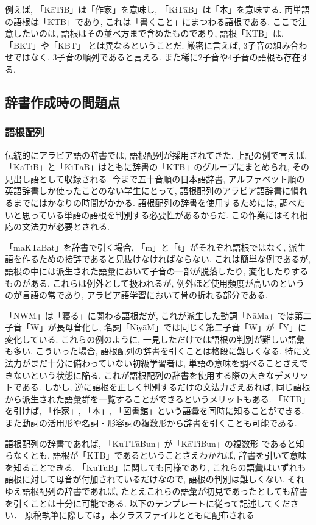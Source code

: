 \documentclass[technicalreport]{ieicej}
\begin{document}
例えば, 「KāTiB」は「作家」を意味し, 「KiTāB」は「本」を意味する. 両単語の語根は「KTB」であり, これは「書くこと」にまつわる語根である. ここで注意したいのは, 語根はその並べ方まで含めたものであり, 語根「KTB」は, 「BKT」や「KBT」 とは異なるということだ. 厳密に言えば, 3子音の組み合わせではなく, 3子音の順列であると言える. また稀に2子音や4子音の語根も存在する. 

\subsection{辞書作成時の問題点}
\subsubsection{語根配列}
伝統的にアラビア語の辞書では, 語根配列が採用されてきた. 上記の例で言えば, 「KāTiB」と「KiTāB」はともに辞書の「KTB」のグループにまとめられ, その見出し語として収録される. 今まで五十音順の日本語辞書, アルファベット順の英語辞書しか使ったことのない学生にとって, 語根配列のアラビア語辞書に慣れるまでにはかなりの時間がかかる. 語根配列の辞書を使用するためには, 調べたいと思っている単語の語根を判別する必要性があるからだ. この作業にはそれ相応の文法力が必要とされる. 

「maKTaBat」を辞書で引く場合, 「m」と「t」がそれぞれ語根ではなく, 派生語を作るための接辞であると見抜けなければならない. これは簡単な例であるが, 語根の中には派生された語彙において子音の一部が脱落したり, 変化したりするものがある. これらは例外として扱われるが, 例外ほど使用頻度が高いのというのが言語の常であり, アラビア語学習において骨の折れる部分である. 

「NWM」は「寝る」に関わる語根だが, これが派生した動詞「NāMa」では第二子音「W」が長母音化し, 名詞「NiyāM」では同じく第二子音「W」が「Y」に変化している. これらの例のように, 一見しただけでは語根の判別が難しい語彙も多い. こういった場合, 語根配列の辞書を引くことは格段に難しくなる. 特に文法力がまだ十分に備わっていない初級学習者は, 単語の意味を調べることさえできないという状態に陥る. これが語根配列の辞書を使用する際の大きなデメリットである. 
しかし, 逆に語根を正しく判別するだけの文法力さえあれば, 同じ語根から派生された語彙群を一覧することができるというメリットもある.  「KTB」を引けば, 「作家」, 「本」, 「図書館」という語彙を同時に知ることができる. また動詞の活用形や名詞・形容詞の複数形から辞書を引くことも可能である. 

語根配列の辞書であれば, 「KuTTāBun」が「KāTiBun」の複数形 であると知らなくとも, 語根が「KTB」であるということさえわかれば, 辞書を引いて意味を知ることできる. 「KuTuB」に関しても同様であり, これらの語彙はいずれも語根に対して母音が付加されているだけなので, 語根の判別は難しくない. それゆえ語根配列の辞書であれば, たとえこれらの語彙が初見であったとしても辞書を引くことは十分に可能である. 
以下のテンプレートに従って記述してください．
原稿執筆に際しては，本クラスファイルとともに配布される
\end{document}
